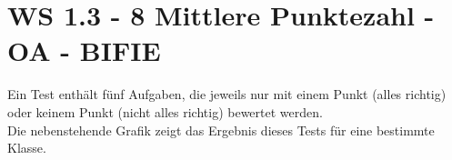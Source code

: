 \section{WS 1.3 - 8 Mittlere Punktezahl - OA - BIFIE}

\begin{beispiel}[WS 1.3]{1} %
\begin{minipage}[t]{0.6\textwidth}
				Ein Test enthält fünf Aufgaben, die jeweils nur mit einem Punkt (alles richtig) oder keinem Punkt (nicht alles richtig) bewertet werden.\\

Die nebenstehende Grafik zeigt das Ergebnis dieses Tests für
eine bestimmte Klasse.
				\end{minipage}
				\begin{minipage}[t]{0.3\textwidth}
				\begin{center}~
				

\end{center}
\end{minipage}
\end{beispiel}
